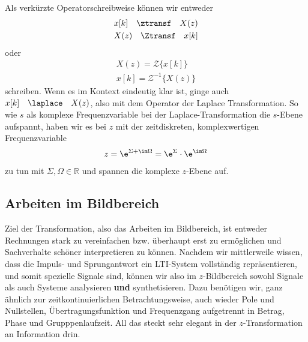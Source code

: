 Als verkürzte Operatorschreibweise können wir entweder
\begin{align}
x[k] \quad\ztransf\quad X(z)\\
X(z) \quad\Ztransf\quad x[k]
\end{align}
oder
\begin{align}
X(z) = \mathcal{Z}\{x[k]\} \\
x[k] = \mathcal{Z}^{-1}\{X(z)\}
\end{align}
schreiben.
Wenn es im Kontext eindeutig klar ist, ginge auch $x[k] \quad\laplace\quad X(z)$,
also mit dem Operator der Laplace Transformation.
%
So wie $s$ als komplexe Frequenzvariable bei der Laplace-Transformation die
$s$-Ebene aufspannt, haben wir es bei $z$ mit der zeitdiskreten, komplexwertigen
Frequenzvariable
\begin{align}
z = \e^{\Sigma + \im \Omega} = \e^{\Sigma} \cdot \e^{\im \Omega}
\end{align}
zu tun mit $\Sigma,\Omega\in\mathbb{R}$ und spannen die komplexe $z$-Ebene auf.
%
\subsection*{Arbeiten im Bildbereich}
Ziel der Transformation, also das Arbeiten im Bildbereich, ist
entweder Rechnungen stark zu vereinfachen bzw. überhaupt erst zu ermöglichen und
Sachverhalte schöner interpretieren zu können.
%
Nachdem wir mittlerweile wissen, dass die Impuls- und Sprungantwort ein LTI-System
vollständig repräsentieren, und somit spezielle
Signale sind, können wir also im $z$-Bildbereich sowohl Signale als auch Systeme
analysieren \textbf{und} synthetisieren.
%
Dazu benötigen wir, ganz ähnlich zur zeitkontinuierlichen Betrachtungsweise, auch
wieder Pole und Nullstellen, Übertragungsfunktion und Frequenzgang aufgetrennt
in Betrag, Phase und Grupppenlaufzeit.
%
All das steckt sehr elegant in der $z$-Transformation an Information drin.
%

